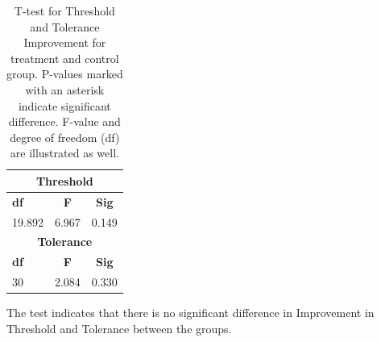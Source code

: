\begin{table}[ht]
\caption{T-test for Threshold and Tolerance Improvement for treatment and control group. P-values marked with an asterisk indicate significant difference. F-value and degree of
freedom (df) are illustrated as well.}
\centering
\begin{tabular}{l c c} 
\toprule
\multicolumn{3}{c}{\textbf{Threshold}} \\
\midrule  
\textbf{df} & \textbf{F} & \textbf{Sig} \\ [0.5ex] %
19.892 & 6.967 & 0.149    \\
\toprule
\multicolumn{3}{c}{\textbf{Tolerance}} \\
\midrule 
\textbf{df} & \textbf{F} & \textbf{Sig} \\ [0.5ex] %
30 & 2.084 & 0.330 \\
\hline
\end{tabular}
\label{table:TTEST}
\end{table}

\noindent
The test indicates that there is no significant difference in Improvement in Threshold and Tolerance between the groups.
